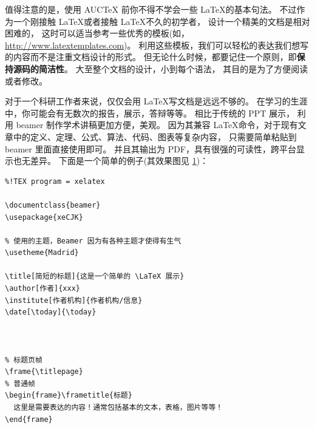 值得注意的是，使用 AUCTeX 前你不得不学会一些 \LaTeX 的基本句法。
不过作为一个刚接触 \LaTeX 或者接触 \LaTeX 不久的初学者，
设计一个精美的文档是相对困难的，
这时可以适当参考一些优秀的模板(如，\url{http://www.latextemplates.com})。
利用这些模板，我们可以轻松的表达我们想写的内容而不是注重文档设计的形式。
但无论什么时候，都要记住一个原则，即\textbf{保持源码的简洁性}。
大至整个文档的设计，小到每个语法，
其目的是为了方便阅读或者修改。

对于一个科研工作者来说，仅仅会用 \LaTeX 写文档是远远不够的。
在学习的生涯中，你可能会有无数次的报告，展示，答辩等等。
相比于传统的 PPT 展示，
利用 beamer 制作学术讲稿更加方便，美观。
因为其兼容 \LaTeX 命令，对于现有文章中的定义、定理、公式、算法、代码、图表等复杂内容，
只需要简单粘贴到 beamer 里面直接使用即可。
并且其输出为 PDF，具有很强的可读性，跨平台显示也无差异。
下面是一个简单的例子(其效果图见 \ref{fig:beamer})：
\begin{verbatim}
%!TEX program = xelatex

\documentclass{beamer}
\usepackage{xeCJK}

% 使用的主题，Beamer 因为有各种主题才使得有生气
\usetheme{Madrid}

\title[简短的标题]{这是一个简单的 \LaTeX 展示}
\author[作者]{xxx}
\institute[作者机构]{作者机构/信息}
\date[\today]{\today}



% 标题页帧
\frame{\titlepage}
% 普通帧
\begin{frame}\frametitle{标题}
  这里是需要表达的内容！通常包括基本的文本，表格，图片等等！
\end{frame}


\end{verbatim}

\begin{figure}[htbp]
	\centering
	\hfill
	\label{fig:beamer}
\end{figure}

